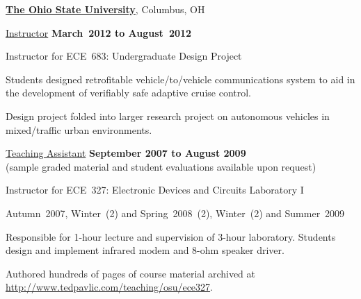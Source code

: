 \documentclass[10pt]{article}
\renewcommand\textit[1]{\underline{#1}}
\begin{document}
\href{http://www.osu.edu/}{\textbf{The Ohio State University}},
Columbus, OH
\begin{outerlist}

\item[] \textit{Instructor}%
    \hfill \textbf{March~2012 to August~2012}
    \begin{innerlist}
        \item Instructor for ECE~683: Undergraduate Design Project
            \begin{innerlist}
                \item Students designed retrofitable vehicle\-/to\-/vehicle
                    communications system to aid in the development of
                    verifiably safe adaptive cruise control.
                \item Design project folded into larger research project
                    on autonomous vehicles in mixed\-/traffic urban
                    environments.
            \end{innerlist}
    \end{innerlist}

\item[] \textit{Teaching Assistant}%
    \hfill \textbf{September 2007 to August 2009}\\
    (sample graded material and student evaluations available upon
    request)
    \begin{innerlist}
        \item Instructor for ECE~327: Electronic Devices and Circuits Laboratory I
        \begin{innerlist}
            \item Autumn~2007, Winter~(2) and Spring~2008~(2),
                Winter~(2) and Summer~2009


            \item Responsible for 1-hour lecture and supervision of
                3-hour laboratory. Students design and implement
                infrared modem and 8-ohm speaker driver.

            \item Authored hundreds of pages of course material
                archived at\\
                \url{http://www.tedpavlic.com/teaching/osu/ece327}.
        \end{innerlist}


\end{innerlist}
\end{outerlist}
\end{document}
